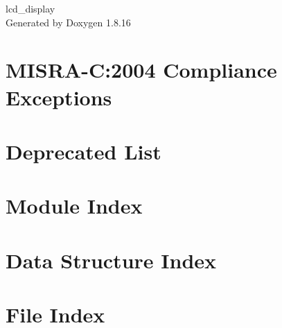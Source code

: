 \let\mypdfximage\pdfximage\def\pdfximage{\immediate\mypdfximage}\documentclass[twoside]{book}
\newcommand{\+}{\discretionary{\mbox{\scriptsize$\hookleftarrow$}}{}{}}
\newcommand{\clearemptydoublepage}{%
  \newpage{\pagestyle{empty}\cleardoublepage}%
}
\begin{document}
\hypersetup{pageanchor=false,
             bookmarksnumbered=true,
             pdfencoding=unicode
            }
\begin{titlepage}
\vspace*{7cm}
\begin{center}%
{\Large lcd\+\_\+display }\\
\vspace*{1cm}
{\large Generated by Doxygen 1.8.16}\\
\end{center}
\end{titlepage}
\clearemptydoublepage
{}
\tableofcontents
\clearemptydoublepage
{}
\hypersetup{pageanchor=true}

\chapter{M\+I\+S\+R\+A-\/C\+:2004 Compliance Exceptions}
\label{_c_m_s_i_s__m_i_s_r_a__exceptions}

\chapter{Deprecated List}
\label{deprecated}

\chapter{Module Index}

\chapter{Data Structure Index}

\chapter{File Index}

\end{document}
